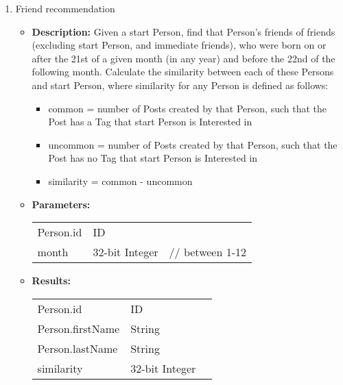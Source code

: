 {\begin{enumerate}
    \item Friend recommendation
        \begin{itemize}
            \item \textbf{Description:}
                Given a start Person, find that Person's friends of friends
                (excluding start Person, and immediate friends), who were born on
                or after the 21st of a given month (in any year) and before the
                22nd of the following month.  Calculate the similarity between each
                of these Persons and start Person, where similarity for any Person
                is defined as follows: 
                \begin{itemize}
                    \item common = number of Posts created by that Person, such that the Post has a Tag that start Person is Interested in
                    \item uncommon = number of Posts created by that Person, such that the Post has no Tag that start Person is Interested in
                    \item similarity = common - uncommon
                \end{itemize}
            \item \textbf{Parameters:} \\
                \begin{tabular}{lll}
                    Person.id 	 						& ID & \parbox[t]{20cm}{\par \strut} \\
                    month 		 						& 32-bit Integer & \parbox[t]{20cm}{// between 1-12\par \strut} \\
                \end{tabular}		
            \item \textbf{Results:} \\
                \begin{tabular}{lll}
                    Person.id 	 						& ID & \parbox[t]{20cm}{\par \strut} \\
                    Person.firstName 	 				& String & \parbox[t]{20cm}{\par \strut} \\
                    Person.lastName 	 				& String & \parbox[t]{20cm}{\par \strut} \\
                    similarity 	 						& 32-bit Integer & \parbox[t]{20cm}{\par \strut} \\

\end{tabular}
\end{itemize}
\end{enumerate}}
